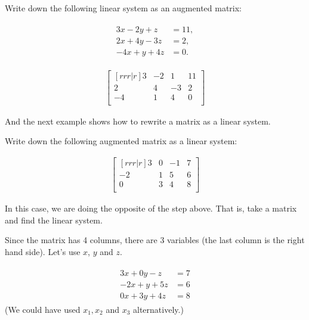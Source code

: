 \begin{example}
Write down the following linear system as an augmented matrix:


\begin{align*}
\begin{split}
3x -2 y + z & = 11, \\
2x + 4y -3z & = 2, \\
-4x + y + 4z & = 0.
\end{split}
\end{align*}

\solution

\begin{align*}
\begin{bmatrix}[rrr|r]
3 & -2 & 1 & 11 \\
2 & 4 & -3 & 2 \\
-4 & 1 & 4 & 0 \\
\end{bmatrix}
\end{align*}

\end{example}

And the next example shows how to rewrite a matrix as a linear system. 

\begin{example}
Write down the following augmented matrix as a linear system:

\begin{align*}
\begin{bmatrix}[rrr|r]
3 & 0 & -1 & 7 \\
-2 & 1 & 5 & 6 \\
0 & 3 & 4 & 8 \\
\end{bmatrix}
\end{align*}

\solution

In this case, we are doing the opposite of the step above.  That is, take a matrix and find the linear system. 

Since the matrix has 4 columns, there are 3 variables (the last column is the right hand side).  Let's use $x$, $y$ and $z$. 

\begin{align*}
\begin{split}
3x + 0 y - z & = 7 \\
-2x + y + 5z & = 6 \\
0x + 3y + 4 z & = 8 
\end{split}
\end{align*}
(We could have used $x_1,x_2$ and $x_3$ alternatively.) 
  
\end{example}

